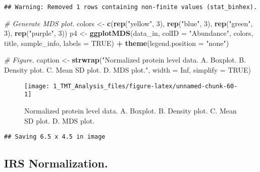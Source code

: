 \documentclass[]{article}
\newenvironment{Shaded}{\begin{snugshade}}{\end{snugshade}}
\newcommand{\KeywordTok}[1]{\textcolor[rgb]{0.13,0.29,0.53}{\textbf{#1}}}
\newcommand{\DataTypeTok}[1]{\textcolor[rgb]{0.13,0.29,0.53}{#1}}
\newcommand{\DecValTok}[1]{\textcolor[rgb]{0.00,0.00,0.81}{#1}}
\newcommand{\StringTok}[1]{\textcolor[rgb]{0.31,0.60,0.02}{#1}}
\newcommand{\CommentTok}[1]{\textcolor[rgb]{0.56,0.35,0.01}{\textit{#1}}}
\newcommand{\OtherTok}[1]{\textcolor[rgb]{0.56,0.35,0.01}{#1}}
\newcommand{\OperatorTok}[1]{\textcolor[rgb]{0.81,0.36,0.00}{\textbf{#1}}}
\newcommand{\NormalTok}[1]{#1}
\begin{document}
\begin{verbatim}
## Warning: Removed 1 rows containing non-finite values (stat_binhex).
\end{verbatim}

\begin{Shaded}
\begin{Highlighting}[]
\CommentTok{# Generate MDS plot.}
\NormalTok{colors <-}\StringTok{ }\KeywordTok{c}\NormalTok{(}\KeywordTok{rep}\NormalTok{(}\StringTok{"yellow"}\NormalTok{, }\DecValTok{3}\NormalTok{), }\KeywordTok{rep}\NormalTok{(}\StringTok{"blue"}\NormalTok{, }\DecValTok{3}\NormalTok{), }\KeywordTok{rep}\NormalTok{(}\StringTok{"green"}\NormalTok{, }\DecValTok{3}\NormalTok{), }\KeywordTok{rep}\NormalTok{(}\StringTok{"purple"}\NormalTok{, }\DecValTok{3}\NormalTok{))}
\NormalTok{p4 <-}\StringTok{ }\KeywordTok{ggplotMDS}\NormalTok{(data_in, }\DataTypeTok{colID =} \StringTok{"Abundance"}\NormalTok{, colors, title, sample_info, }\DataTypeTok{labels =} \OtherTok{TRUE}\NormalTok{) }\OperatorTok{+}
\StringTok{  }\KeywordTok{theme}\NormalTok{(}\DataTypeTok{legend.position =} \StringTok{"none"}\NormalTok{)}

\CommentTok{# Figure.}
\NormalTok{caption <-}\StringTok{ }\KeywordTok{strwrap}\NormalTok{(}\StringTok{"Normalized protein level data. A. Boxplot. B. Density plot. }
\StringTok{                   C. Mean SD plot. D. MDS plot."}\NormalTok{, }\DataTypeTok{width =} \OtherTok{Inf}\NormalTok{, }\DataTypeTok{simplify =} \OtherTok{TRUE}\NormalTok{)}
\end{Highlighting}
\end{Shaded}

\begin{figure}

{\centering \texttt{[image: 1\_TMT\_Analysis\_files/figure-latex/unnamed-chunk-60-1]} 

}

\caption{Normalized protein level data. A. Boxplot. B. Density plot.  C. Mean SD plot. D. MDS plot.}\label{fig:unnamed-chunk-60}
\end{figure}

\begin{verbatim}
## Saving 6.5 x 4.5 in image
\end{verbatim}

\subsection{IRS Normalization.}\label{irs-normalization.}
\end{document}
